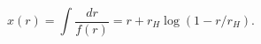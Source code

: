 \begin{equation} \label{tortoise-definition}
x(r) = \int \frac{dr}{f(r)} = r + r_H \log(1-r/r_H).
\end{equation}

